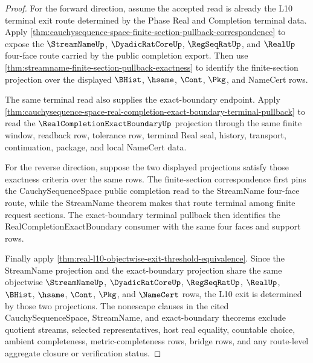 \begin{proof}
For the forward direction, assume the accepted read is already the L10 terminal exit route determined by the Phase Real and Completion terminal data. Apply \autoref{thm:cauchysequence-space-finite-section-pullback-correspondence} to expose the $\StreamNameUp$, $\DyadicRatCoreUp$, $\RegSeqRatUp$, and $\RealUp$ four-face route carried by the public completion export. Then use \autoref{thm:streamname-finite-section-pullback-exactness} to identify the finite-section projection over the displayed $\BHist$, $\hsame$, $\Cont$, $\Pkg$, and NameCert rows.

The same terminal read also supplies the exact-boundary endpoint. Apply \autoref{thm:cauchysequence-space-real-completion-exact-boundary-terminal-pullback} to read the $\RealCompletionExactBoundaryUp$ projection through the same finite window, readback row, tolerance row, terminal Real seal, history, transport, continuation, package, and local NameCert data.

For the reverse direction, suppose the two displayed projections satisfy those exactness criteria over the same rows. The finite-section correspondence first pins the CauchySequenceSpace public completion read to the StreamName four-face route, while the StreamName theorem makes that route terminal among finite request sections. The exact-boundary terminal pullback then identifies the RealCompletionExactBoundary consumer with the same four faces and support rows.

Finally apply \autoref{thm:real-l10-objectwise-exit-threshold-equivalence}. Since the StreamName projection and the exact-boundary projection share the same objectwise $\StreamNameUp$, $\DyadicRatCoreUp$, $\RegSeqRatUp$, $\RealUp$, $\BHist$, $\hsame$, $\Cont$, $\Pkg$, and $\NameCert$ rows, the L10 exit is determined by those two projections. The nonescape clauses in the cited CauchySequenceSpace, StreamName, and exact-boundary theorems exclude quotient streams, selected representatives, host real equality, countable choice, ambient completeness, metric-completeness rows, bridge rows, and any route-level aggregate closure or verification status.
\end{proof}



